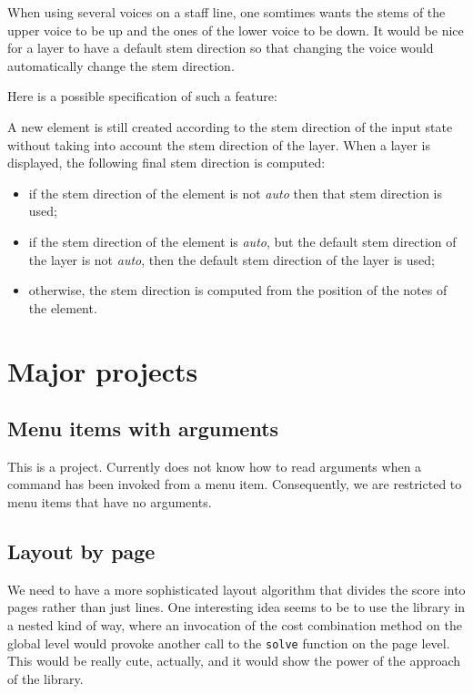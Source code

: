 When using several voices on a staff line, one somtimes wants the
stems of the upper voice to be up and the ones of the lower voice to
be down.  It would be nice for a layer to have a default stem
direction so that changing the voice would automatically change the
stem direction.  

Here is a possible specification of such a feature:

A new element is still created according to the stem direction of the
input state without taking into account the stem direction of the
layer.  When a layer is displayed, the following final stem direction
is computed:

\begin{itemize}
\item if the stem direction of the element is not \emph{auto} then
  that stem direction is used;
\item if the stem direction of the element is \emph{auto}, but the
  default stem direction of the layer is not \emph{auto}, then the
  default stem direction of the layer is used;
\item otherwise, the stem direction is computed from the position of
  the notes of the element. 
\end{itemize}

\section{Major projects}

\subsection{Menu items with arguments}

This is a {\clim} project.  Currently {\clim} does not know how to
read arguments when a command has been invoked from a menu item.
Consequently, we are restricted to menu items that have no arguments. 

\subsection{Layout by page}

We need to have a more sophisticated layout algorithm that divides the
score into pages rather than just lines.  One interesting idea seems
to be to use the {\obseq} library in a nested kind of way, where an
invocation of the cost combination method on the global level would
provoke another call to the \texttt{solve} function on the page
level.  This would be really cute, actually, and it would show the
power of the approach of the {\obseq} library.  

